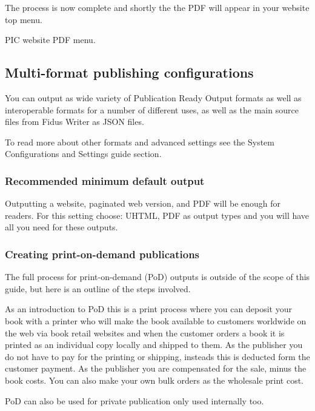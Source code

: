 \documentclass{article}
\begin{document}
The process is now complete and shortly the the PDF will appear in your website top menu.


PIC website PDF menu.


\subsection{Multi-format publishing configurations}\label{H6290333}



You can output as wide variety of Publication Ready Output formats as well as interoperable formats for a number of different uses, as well as the main source files from Fidus Writer as JSON files.


To read more about other formats and advanced settings see the System Configurations and Settings guide section.


\subsubsection{Recommended minimum default output}\label{H2167774}



Outputting a website, paginated web version, and PDF will be enough for readers. For this setting choose: UHTML, PDF as output types and you will have all you need for these outputs.


\subsubsection{Creating print-on-demand publications}\label{H6991098}



The full process for print-on-demand (PoD) outputs is outside of the scope of this guide, but here is an outline of the steps involved.


As an introduction to PoD this is a print process where you can deposit your book with a printer who will make the book available to customers worldwide on the web via book retail websites and when the customer orders a book it is printed as an individual copy locally and shipped to them. As the publisher you do not have to pay for the printing or shipping, insteads this is deducted form the customer payment. As the publisher you are compensated for the sale, minus the book costs. You can also make your own bulk orders as the wholesale print cost.


PoD can also be used for private publication only used internally too.
\end{document}
